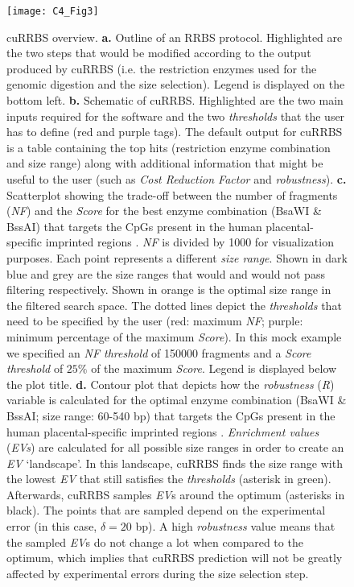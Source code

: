 \begin{figure}[htbp!] 
	\centering    
	\texttt{[image: C4\_Fig3]}
	\caption[cuRRBS overview]{cuRRBS overview. \textbf{a.} Outline of an RRBS protocol. Highlighted are the two steps that would be modified according to the output produced by cuRRBS (i.e. the restriction enzymes used for the genomic digestion and the size selection). Legend is displayed on the bottom left. \textbf{b.} Schematic of cuRRBS. Highlighted are the two main inputs required for the software and the two \textit{thresholds} that the user has to define (red and purple tags). The default output for cuRRBS is a table containing the top hits (restriction enzyme combination and size range) along with additional information that might be useful to the user (such as \textit{Cost Reduction Factor} and \textit{robustness}). \textbf{c.} Scatterplot showing the trade-off between the number of fragments (\textit{NF}) and the \textit{Score} for the best enzyme combination (BsaWI \& BssAI) that targets the CpGs present in the human placental-specific imprinted regions \cite{Hanna2016}. \textit{NF} is divided by 1000 for visualization purposes. Each point represents a different \textit{size range}. Shown in dark blue and grey are the size ranges that would and would not pass filtering respectively. Shown in orange is the optimal size range in the filtered search space. The dotted lines depict the \textit{thresholds} that need to be specified by the user (red: maximum \textit{NF}; purple: minimum percentage of the maximum \textit{Score}). In this mock example we specified an \textit{NF threshold} of 150000 fragments and a \textit{Score threshold} of $25\%$ of the maximum \textit{Score}. Legend is displayed below the plot title. \textbf{d.} Contour plot that depicts how the \textit{robustness} (\textit{R}) variable is calculated for the optimal enzyme combination (BsaWI \& BssAI; size range: 60-540 bp) that targets the CpGs present in the human placental-specific imprinted regions \cite{Hanna2016}. \textit{Enrichment values} (\textit{EVs}) are calculated for all possible size ranges in order to create an \textit{EV} `landscape'. In this landscape, cuRRBS finds the size range with the lowest \textit{EV} that still satisfies the \textit{thresholds} (asterisk in green). Afterwards, cuRRBS samples \textit{EV}s around the optimum (asterisks in black). The points that are sampled depend on the experimental error (in this case, $\delta = 20$ bp). A high \textit{robustness} value means that the sampled \textit{EV}s do not change a lot when compared to the optimum, which implies that cuRRBS prediction will not be greatly affected by experimental errors during the size selection step.}
	\label{fig:c4_fig3}
\end{figure}


